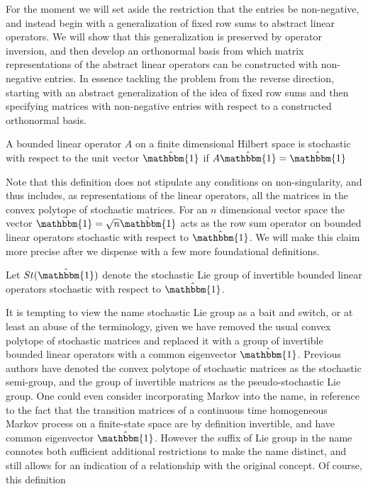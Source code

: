 For the moment we will set aside the restriction that the entries be non-negative, and
instead begin with a generalization of fixed row sums to abstract linear operators. We will
show that this generalization is preserved by operator inversion, and then develop an
orthonormal basis from which matrix representations of the abstract linear operators can be
constructed with non-negative entries. In essence tackling the problem from the reverse
direction, starting with an abstract generalization of the idea of fixed row sums and then 
specifying matrices with non-negative entries with respect to a constructed orthonormal
basis.
\begin{definition}
	A bounded linear operator $A$ on a finite dimensional Hilbert space is stochastic with
	respect to the unit vector $\hat{\mathbbm{1}}$ if $A \hat{\mathbbm{1}} = \hat{\mathbbm{1}}$
\end{definition}
Note that this definition does not stipulate any conditions on non-singularity, and thus
includes, as representations of the linear operators, all the matrices in the convex
polytope of stochastic matrices. For an $n$ dimensional vector space the vector $\vec{\mathbbm{1}} = \sqrt{n} \hat{\mathbbm{1}}$
acts as the row sum operator on bounded linear operators stochastic with respect to $\hat{\mathbbm{1}}$. 
We will make this claim more precise after we dispense with a few more foundational
definitions.
\begin{definition}
	Let $St(\hat{\mathbbm{1}})$ denote the stochastic Lie group of invertible bounded linear
	operators stochastic with respect to $\hat{\mathbbm{1}}$.
\end{definition}
It is tempting to view the name stochastic Lie group as a bait and switch, or at least an
abuse of the terminology, given we have removed the usual convex polytope of stochastic
matrices and replaced it with a group of invertible bounded linear operators with a common
eigenvector $\hat{\mathbbm{1}}$. Previous authors have denoted the convex polytope of
stochastic matrices as the stochastic semi-group, and the group of invertible matrices as
the pseudo-stochastic Lie group. One could even consider incorporating Markov into the name,
in reference to the fact that the transition matrices of a continuous time homogeneous
Markov process on a finite-state space are by definition invertible, and have common
eigenvector $\hat{\mathbbm{1}}$. However the suffix of Lie group in the name connotes both
sufficient additional restrictions to make the name distinct, and still allows for an
indication of a relationship with the original concept. Of course, this definition
